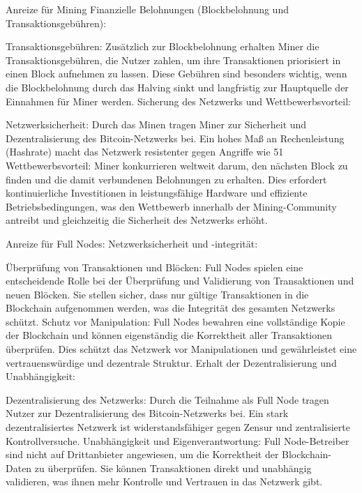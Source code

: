 \documentclass[german]{../uebung}
\begin{document}
\begin{exercise}{4}
    Anreize für Mining
    Finanzielle Belohnungen (Blockbelohnung und Transaktionsgebühren):

    Transaktionsgebühren: Zusätzlich zur Blockbelohnung erhalten Miner die Transaktionsgebühren, die Nutzer zahlen, um ihre Transaktionen priorisiert in einen Block aufnehmen zu lassen. Diese Gebühren sind besonders wichtig, wenn die Blockbelohnung durch das Halving sinkt und langfristig zur Hauptquelle der Einnahmen für Miner werden.
    Sicherung des Netzwerks und Wettbewerbsvorteil:

    Netzwerksicherheit: Durch das Minen tragen Miner zur Sicherheit und Dezentralisierung des Bitcoin-Netzwerks bei. Ein hohes Maß an Rechenleistung (Hashrate) macht das Netzwerk resistenter gegen Angriffe wie 51%
    Wettbewerbsvorteil: Miner konkurrieren weltweit darum, den nächsten Block zu finden und die damit verbundenen Belohnungen zu erhalten. Dies erfordert kontinuierliche Investitionen in leistungsfähige Hardware und effiziente Betriebsbedingungen, was den Wettbewerb innerhalb der Mining-Community antreibt und gleichzeitig die Sicherheit des Netzwerks erhöht.

    Anreize für Full Nodes:
    Netzwerksicherheit und -integrität:

    Überprüfung von Transaktionen und Blöcken: Full Nodes spielen eine entscheidende Rolle bei der Überprüfung und Validierung von Transaktionen und neuen Blöcken. Sie stellen sicher, dass nur gültige Transaktionen in die Blockchain aufgenommen werden, was die Integrität des gesamten Netzwerks schützt.
    Schutz vor Manipulation: Full Nodes bewahren eine vollständige Kopie der Blockchain und können eigenständig die Korrektheit aller Transaktionen überprüfen. Dies schützt das Netzwerk vor Manipulationen und gewährleistet eine vertrauenswürdige und dezentrale Struktur.
    Erhalt der Dezentralisierung und Unabhängigkeit:

    Dezentralisierung des Netzwerks: Durch die Teilnahme als Full Node tragen Nutzer zur Dezentralisierung des Bitcoin-Netzwerks bei. Ein stark dezentralisiertes Netzwerk ist widerstandsfähiger gegen Zensur und zentralisierte Kontrollversuche.
    Unabhängigkeit und Eigenverantwortung: Full Node-Betreiber sind nicht auf Drittanbieter angewiesen, um die Korrektheit der Blockchain-Daten zu überprüfen. Sie können Transaktionen direkt und unabhängig validieren, was ihnen mehr Kontrolle und Vertrauen in das Netzwerk gibt.
\end{exercise}
\end{document}
